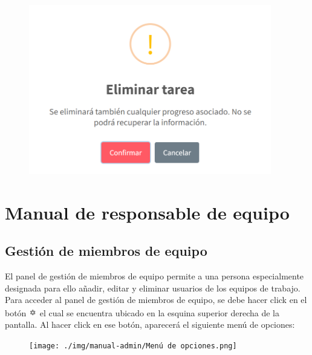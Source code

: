 \documentclass[
  letterpaper,
  DIV=11,
  numbers=noendperiod]{scrreprt}
\begin{document}
\begin{figure}

{\centering \includegraphics[width=4.16667in,height=\textheight]{./img/manual-user/task-delete.png}

}

\end{figure}


\hypertarget{manual-de-responsable-de-equipo}{%
\chapter{Manual de responsable de
equipo}\label{manual-de-responsable-de-equipo}}

\hypertarget{gestiuxf3n-de-miembros-de-equipo}{%
\section{Gestión de miembros de
equipo}\label{gestiuxf3n-de-miembros-de-equipo}}

El panel de gestión de miembros de equipo permite a una persona
especialmente designada para ello añadir, editar y eliminar usuarios de
los equipos de trabajo. Para acceder al panel de gestión de miembros de
equipo, se debe hacer click en el botón
\includegraphics[width=0.13542in,height=0.17708in]{./img/manual-admin/Tuerca.png}
el cual se encuentra ubicado en la esquina superior derecha de la
pantalla. Al hacer click en ese botón, aparecerá el siguiente menú de
opciones:

\begin{figure}

{\centering \texttt{[image: ./img/manual-admin/Menú de opciones.png]}

}

\end{figure}
\end{document}
